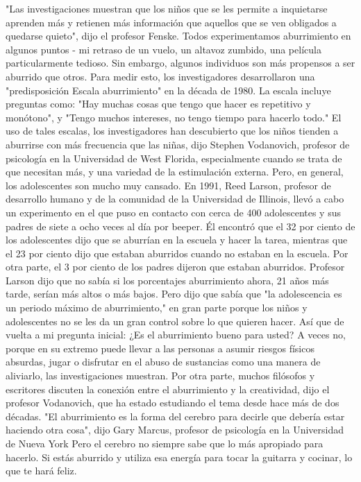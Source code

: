 "Las investigaciones muestran que los niños que se les permite a inquietarse aprenden más y retienen más información que aquellos que se ven obligados a quedarse quieto", dijo el profesor Fenske.
Todos experimentamos aburrimiento en algunos puntos - mi retraso de un vuelo, un altavoz zumbido, una película particularmente tedioso.
Sin embargo, algunos individuos son más propensos a ser aburrido que otros.
Para medir esto, los investigadores desarrollaron una "predisposición Escala aburrimiento" en la década de 1980.
La escala incluye preguntas como: "Hay muchas cosas que tengo que hacer es repetitivo y monótono", y "Tengo muchos intereses, no tengo tiempo para hacerlo todo."
El uso de tales escalas, los investigadores han descubierto que los niños tienden a aburrirse con más frecuencia que las niñas, dijo Stephen Vodanovich, profesor de psicología en la Universidad de West Florida, especialmente cuando se trata de que necesitan más, y una variedad de la estimulación externa.
Pero, en general, los adolescentes son mucho muy cansado.
En 1991, Reed Larson, profesor de desarrollo humano y de la comunidad de la Universidad de Illinois, llevó a cabo un experimento en el que puso en contacto con cerca de 400 adolescentes y sus padres de siete a ocho veces al día por beeper.
Él encontró que el 32 por ciento de los adolescentes dijo que se aburrían en la escuela y hacer la tarea, mientras que el 23 por ciento dijo que estaban aburridos cuando no estaban en la escuela.
Por otra parte, el 3 por ciento de los padres dijeron que estaban aburridos.
Profesor Larson dijo que no sabía si los porcentajes aburrimiento ahora, 21 años más tarde, serían más altos o más bajos.
Pero dijo que sabía que "la adolescencia es un periodo máximo de aburrimiento," en gran parte porque los niños y adolescentes no se les da un gran control sobre lo que quieren hacer.
Así que de vuelta a mi pregunta inicial: ¿Es el aburrimiento bueno para usted?
A veces no, porque en su extremo puede llevar a las personas a asumir riesgos físicos absurdas, jugar o disfrutar en el abuso de sustancias como una manera de aliviarlo, las investigaciones muestran.
Por otra parte, muchos filósofos y escritores discuten la conexión entre el aburrimiento y la creatividad, dijo el profesor Vodanovich, que ha estado estudiando el tema desde hace más de dos décadas.
"El aburrimiento es la forma del cerebro para decirle que debería estar haciendo otra cosa", dijo Gary Marcus, profesor de psicología en la Universidad de Nueva York
Pero el cerebro no siempre sabe que lo más apropiado para hacerlo.
Si estás aburrido y utiliza esa energía para tocar la guitarra y cocinar, lo que te hará feliz.
